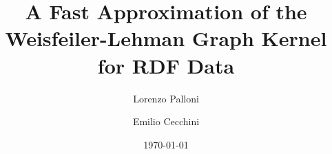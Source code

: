 %
%
%
%

%
% 
\documentclass{beamer}



	\title{A Fast Approximation of the Weisfeiler-Lehman Graph Kernel for RDF Data}
	\author{Lorenzo Palloni \and Emilio Cecchini}
	\date{\today} 
	
	\begin{frame}
	\titlepage
\end{frame}

\begin{frame}\frametitle{Table of contents}\tableofcontents
\end{frame} 


\section{RDF Data} 
\begin{frame}\frametitle{RDF (Resource Description Framework) Data} 
\begin{itemize}
\item is a data model based on the form \textbf{subject-predicate-object}
\item express relation between resources (web resources)
\item was adopted as a W3C (World Wide Web Consortium) recommendation in 1999
\end{itemize}
\end{frame}

\subsection{RDF Data - example}
\begin{frame}\frametitle{} 
\textbf{mettere qua l'esempio iniziale del grafo che relabelleremo}
\end{frame}


